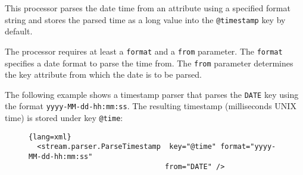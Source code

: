 
This processor parses the date time from an attribute using a specified
format string and stores the parsed time as a long value into the
\texttt{@timestamp} key by default.

The processor requires at least a \texttt{format} and a \texttt{from}
parameter. The \texttt{format} specifies a date format to parse the time
from. The \texttt{from} parameter determines the key attribute from
which the date is to be parsed.

The following example shows a timestamp parser that parses the
\texttt{DATE} key using the format \texttt{yyyy-MM-dd-hh:mm:ss}. The
resulting timestamp (milliseconds UNIX time) is stored under key
\texttt{@time}:

\begin{figure}[h!]
  \begin{lstlisting}{lang=xml}
  <stream.parser.ParseTimestamp  key="@time" format="yyyy-MM-dd-hh:mm:ss"
                                from="DATE" />
  \end{lstlisting}
\end{figure}


\begin{table}[h]
\end{table}
